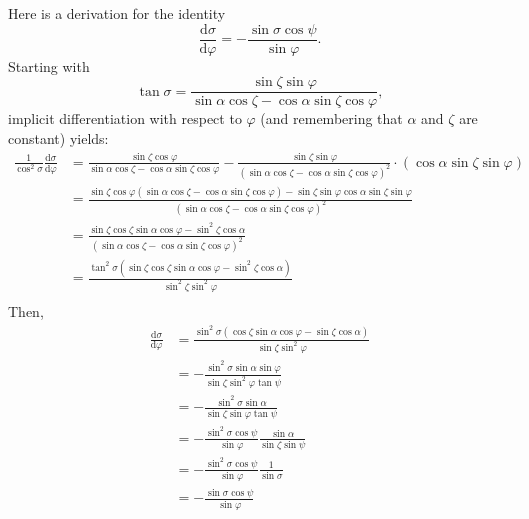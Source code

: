 \documentclass{book}
\newcommand{\phase}{\varphi}
\newcommand{\deriv}[2]{\frac{\text{d}{#1}}{\text{d}{#2}}}
\begin{document}
Here is a derivation for the identity
\begin{equation}
    \deriv{\sigma}{\phase} = -\frac{\sin\sigma \cos\psi}{\sin\phase}.
\end{equation}
Starting with
\begin{equation}
    \tan\sigma = \frac{\sin\zeta \sin\phase}{\sin\alpha \cos\zeta - \cos\alpha \sin\zeta \cos\phase},
\end{equation}
implicit differentiation with respect to $\phase$ (and remembering that $\alpha$ and $\zeta$ are constant) yields:
\begin{equation}
    \begin{aligned}
    \frac{1}{\cos^2\sigma} \deriv{\sigma}{\phase}
        &= \frac{\sin\zeta \cos\phase}{\sin\alpha \cos\zeta - \cos\alpha \sin\zeta \cos\phase} -
            \frac{\sin\zeta \sin\phase}{(\sin\alpha \cos\zeta - \cos\alpha \sin\zeta \cos\phase)^2} \cdot (\cos\alpha \sin\zeta \sin\phase) \\
        &= \frac{\sin\zeta \cos\phase (\sin\alpha \cos\zeta - \cos\alpha \sin\zeta \cos\phase) -
            \sin\zeta \sin\phase \cos\alpha \sin\zeta \sin\phase}{(\sin\alpha \cos\zeta - \cos\alpha \sin\zeta \cos\phase)^2} \\
        &= \frac{\sin\zeta \cos\zeta \sin\alpha \cos\phase - \sin^2\zeta \cos\alpha}{(\sin\alpha \cos\zeta - \cos\alpha \sin\zeta \cos\phase)^2} \\
        &= \frac{\tan^2\sigma (\sin\zeta \cos\zeta \sin\alpha \cos\phase - \sin^2\zeta \cos\alpha)}{\sin^2\zeta \sin^2\phase} \\
    \end{aligned}
\end{equation}
Then,
\begin{equation}
    \begin{aligned}
    \deriv{\sigma}{\phase}
        &= \frac{\sin^2\sigma (\cos\zeta \sin\alpha \cos\phase - \sin\zeta \cos\alpha)}{\sin\zeta \sin^2\phase} \\
        &= -\frac{\sin^2\sigma \sin\alpha \sin\phase}{\sin\zeta \sin^2\phase \tan\psi} \\
        &= -\frac{\sin^2\sigma \sin\alpha}{\sin\zeta \sin\phase \tan\psi} \\
        &= -\frac{\sin^2\sigma \cos\psi}{\sin\phase} \frac{\sin\alpha}{\sin\zeta \sin\psi} \\
        &= -\frac{\sin^2\sigma \cos\psi}{\sin\phase} \frac{1}{\sin\sigma} \\
        &= -\frac{\sin\sigma \cos\psi}{\sin\phase}
    \end{aligned}
\end{equation}
\end{document}
